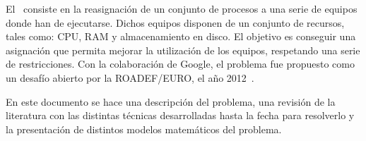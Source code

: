 \documentclass[../informe2.tex]{subfiles}
\begin{document}
El \mrp\ consiste en la reasignación de un conjunto de procesos a una serie de equipos donde han de ejecutarse. Dichos equipos disponen de un conjunto de recursos, tales como: CPU, RAM y almacenamiento en disco. El objetivo es conseguir una asignación que permita mejorar la utilización de los equipos, respetando una serie de restricciones. Con la colaboración de Google, el problema fue propuesto como un desafío abierto por la ROADEF/EURO, el año 2012~\cite{2012ProblemDefinition}. \par
\noindent En este documento se hace una descripción del problema, una revisión de la literatura con las distintas técnicas desarrolladas hasta la fecha para resolverlo y la presentación de distintos modelos matemáticos del problema.
\end{document}

